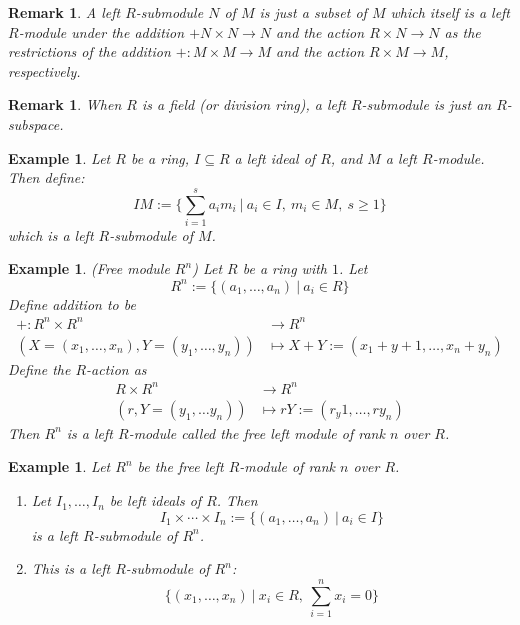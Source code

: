 \documentclass[a4paper,8pt]{article}
\newcommand{\hlt}[1]{\textit{{\color{blue}#1}}}
\theoremstyle{theorem}
\newtheorem{example}[theorem]{Example}
\newtheorem{remark}[theorem]{Remark}
\begin{document}
\begin{remark}
A left $R$-submodule $N$ of $M$ is just a subset of $M$ which itself is a left $R$-module under the addition $+ N \times N \rightarrow N$ and the action $R \times N \rightarrow N$ as the restrictions of the addition $+: M \times M \rightarrow M$ and the action $R \times M \rightarrow M$, respectively.
\end{remark}

\begin{remark}
When $R$ is a field (or division ring), a left $R$-submodule is just an $R$-subspace.	
\end{remark}

\begin{example}
Let $R$ be a ring, $I \subseteq R$ a left ideal of $R$, and $M$ a left $R$-module. Then define:
\begin{equation}
IM := \{ \sum_{i=1}^s a_i m_i \ | \ a_i \in I, \ m_i \in M, \ s \geq 1\} \nonumber
\end{equation}
which is a left $R$-submodule of $M$.
\end{example}

\begin{example}
\hlt{(Free module $R^n$)} Let $R$ be a ring with $1$. Let
\begin{equation}
R^n := \{(a_1, \ldots, a_n) \ | \ a_i \in R\} \nonumber
\end{equation}
Define addition to be
\begin{align}
+: R^n \times R^n &\rightarrow R^n \nonumber \\
(X=(x_1, \ldots, x_n), Y = (y_1, \ldots, y_n)) &\mapsto X+Y := (x_1 + y+1, \ldots, x_n + y_n) \nonumber
\end{align}
Define the $R$-action as
\begin{align}
R \times R^n &\rightarrow R^n \nonumber \\
(r, Y = (y_1, \ldots y_n)) &\mapsto rY := (r_y1, \ldots, ry_n) \nonumber
\end{align}
Then $R^n$ is a left $R$-module called the \hlt{free left module of rank $n$ over $R$}.
\end{example}

\begin{example}
Let $R^n$ be the free left $R$-module of rank $n$ over $R$.
\begin{enumerate}[label=(\roman*)]
\item Let $I_1, \ldots, I_n$ be left ideals of $R$. Then
\begin{equation}
I_1 \times \cdots \times I_n := \{(a_1, \ldots, a_n) \ | \ a_i \in I\} \nonumber
\end{equation}
is a left $R$-submodule of $R^n$.
\item This is a left $R$-submodule of $R^n$:
\begin{equation}
\{(x_1, \ldots, x_n) \ | \ x_i \in R, \ \sum_{i=1}^n x_i = 0\} \nonumber
\end{equation}
\end{enumerate}
\end{example}
\end{document}
